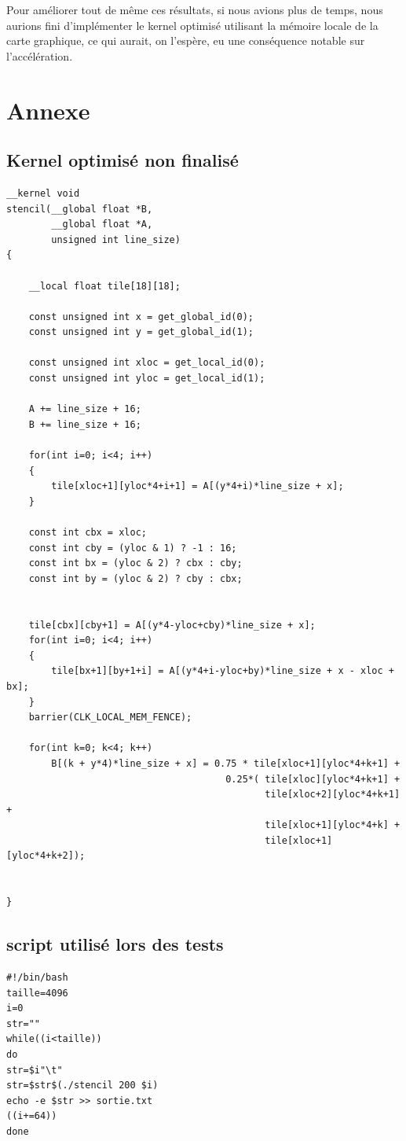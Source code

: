\documentclass{article}
\begin{document}
Pour améliorer tout de même ces résultats, si nous avions plus de
temps, nous aurions fini d'implémenter le kernel optimisé utilisant la
mémoire locale de la carte graphique, ce qui aurait, on l'espère, eu
une conséquence notable sur l'accélération.

\clearpage
\section*{Annexe}
\subsection{Kernel optimisé non finalisé}
\label{kernel}
\begin{verbatim}
__kernel void
stencil(__global float *B,
        __global float *A,
        unsigned int line_size)
{

    __local float tile[18][18];

    const unsigned int x = get_global_id(0);
    const unsigned int y = get_global_id(1);

    const unsigned int xloc = get_local_id(0);
    const unsigned int yloc = get_local_id(1);

    A += line_size + 16;
    B += line_size + 16;

    for(int i=0; i<4; i++)
    {
        tile[xloc+1][yloc*4+i+1] = A[(y*4+i)*line_size + x];
    }

    const int cbx = xloc;
    const int cby = (yloc & 1) ? -1 : 16;
    const int bx = (yloc & 2) ? cbx : cby;
    const int by = (yloc & 2) ? cby : cbx;


    tile[cbx][cby+1] = A[(y*4-yloc+cby)*line_size + x];
    for(int i=0; i<4; i++)
    {
        tile[bx+1][by+1+i] = A[(y*4+i-yloc+by)*line_size + x - xloc + bx];
    }
    barrier(CLK_LOCAL_MEM_FENCE);

    for(int k=0; k<4; k++)
        B[(k + y*4)*line_size + x] = 0.75 * tile[xloc+1][yloc*4+k+1] +
                                       0.25*( tile[xloc][yloc*4+k+1] +
                                              tile[xloc+2][yloc*4+k+1] +
                                              tile[xloc+1][yloc*4+k] +
                                              tile[xloc+1][yloc*4+k+2]);


}
\end{verbatim}

\subsection{script utilisé lors des tests}
\label{script}
\begin{verbatim}
#!/bin/bash
taille=4096
i=0
str=""
while((i<taille))
do
str=$i"\t"
str=$str$(./stencil 200 $i)
echo -e $str >> sortie.txt
((i+=64))
done
\end{verbatim}
\end{document}
